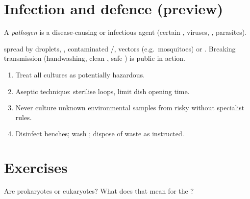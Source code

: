 \section{Infection and defence (preview)}

\begin{definition}[Pathogen]\label{def:g8:microbiology:pathogen}
A \emph{pathogen} is a disease-causing  or
infectious agent (certain , viruses, , parasites).
\end{definition}

\begin{example}[Transmission]\label{ex:g8:microbiology:trans}
 spread by droplets, , contaminated /, vectors
(e.g.\ mosquitoes) or . Breaking transmission (handwashing, clean
, safe ) is public  in action.
\end{example}

\begin{method}\label{met:g8:microbiology:safe}
\begin{enumerate}
  \item Treat all cultures as potentially hazardous.
  \item Aseptic technique: sterilise loops, limit dish opening time.
  \item Never culture unknown environmental samples from risky 
        without specialist rules.
  \item Disinfect benches; wash ; dispose of waste as instructed.
\end{enumerate}
\end{method}

\section{Exercises}

\begin{exercise}[$\star$]\label{exo:g8:microbiology:1}
Are  prokaryotes or eukaryotes? What does that mean for the
?
\end{exercise}

